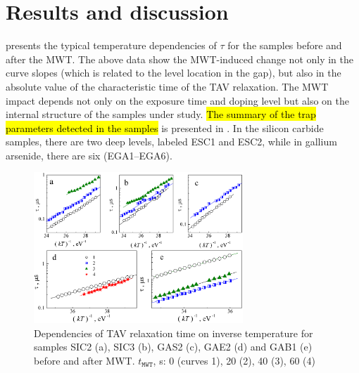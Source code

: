 \documentclass[10pt]{iopart}
\begin{document}
\section{Results and discussion}\label{sec:Rez}


 presents the typical temperature dependencies of $\tau$ for the samples before and after the MWT.
The above data show the MWT-induced change not only in the curve slopes (which is related to the level location in the gap),
but also in the absolute value of the characteristic time of the TAV relaxation.
The MWT impact depends not only on the exposure time and doping level but also on the internal structure of the samples under study.
\hl{The summary of the trap parameters detected in the samples} is presented in .
In the silicon carbide samples, there are two deep levels, labeled ESC1 and ESC2, while in gallium arsenide, there are six (EGA1–EGA6).

\begin{figure}
\center
\includegraphics[width=0.7\textwidth]{Fig3}
\caption{\label{figTauTAV}
Dependencies of TAV relaxation time on inverse temperature for samples SIC2 (a), SIC3 (b), GAS2 (c), GAE2 (d) and GAB1 (e) before and after MWT.
$t_\mathtt{MWT}$, s: 0 (curves 1), 20 (2), 40 (3), 60 (4)
}%
\end{figure}
\end{document}
